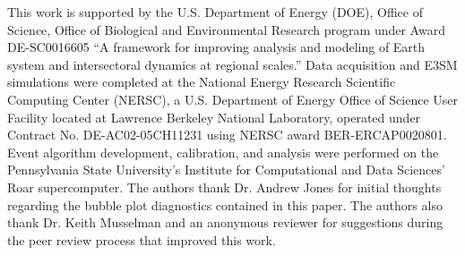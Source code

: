 \documentclass[nhess, manuscript]{copernicus}
\begin{document}

\begin{acknowledgements}
This work is supported by the U.S. Department of Energy (DOE), Office of Science, Office of Biological and Environmental Research program under Award DE-SC0016605 ``A framework for improving analysis and modeling of Earth system and intersectoral dynamics at regional scales.'' Data acquisition and E3SM simulations were completed at the National Energy Research Scientific Computing Center (NERSC), a U.S. Department of Energy Office of Science User Facility located at Lawrence Berkeley National Laboratory, operated under Contract No. DE-AC02-05CH11231 using NERSC award BER-ERCAP0020801. Event algorithm development, calibration, and analysis were performed on the Pennsylvania State University's Institute for Computational and Data Sciences' Roar supercomputer. The authors thank Dr. Andrew Jones for initial thoughts regarding the bubble plot diagnostics contained in this paper. The authors also thank Dr. Keith Musselman and an anonymous reviewer for suggestions during the peer review process that improved this work.
\end{acknowledgements}


%
%




%
%
%
%
%
\end{document}
